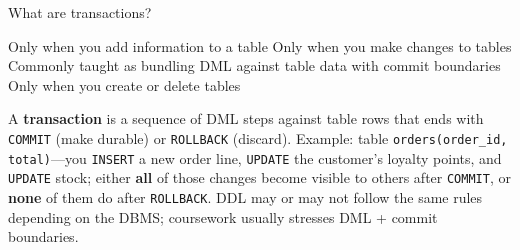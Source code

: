 \question[4]
What are transactions?
\begin{choices}
  \choice Only when you add information to a table
  \choice Only when you make changes to tables
  \CorrectChoice Commonly taught as bundling DML against table data with commit boundaries
  \choice Only when you create or delete tables
\end{choices}
\begin{solution}
  A \textbf{transaction} is a sequence of DML steps against table rows that ends with \texttt{COMMIT} (make durable) or \texttt{ROLLBACK} (discard). Example: table \texttt{orders(order\_id, total)}---you \texttt{INSERT} a new order line, \texttt{UPDATE} the customer's loyalty points, and \texttt{UPDATE} stock; either \textbf{all} of those changes become visible to others after \texttt{COMMIT}, or \textbf{none} of them do after \texttt{ROLLBACK}. DDL may or may not follow the same rules depending on the DBMS; coursework usually stresses DML + commit boundaries.
\end{solution}

